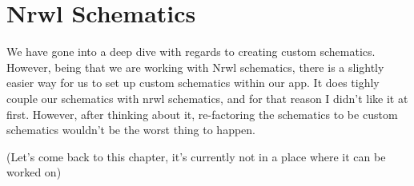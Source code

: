\maketitle{}
\section{ Nrwl Schematics }

We have gone into a deep dive with regards to creating custom schematics.
However, being that we are working with Nrwl schematics, there is a slightly
easier way for us to set up custom schematics within our app. It does tighly
couple our schematics with nrwl schematics, and for that reason I didn't like
it at first. However, after thinking about it, re-factoring the schematics to
be custom schematics wouldn't be the worst thing to happen.

(Let's come back to this chapter, it's currently not in a place where it can be
 worked on)
